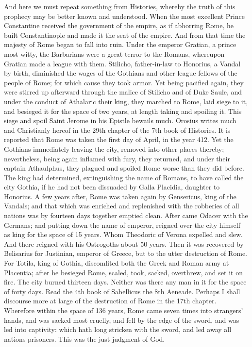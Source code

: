 And here we must repeat something from Histories, whereby the truth of this prophecy may be better known and understood. When the most excellent Prince Constantine received the government of the empire, as if abhorring Rome, he built Constantinople and made it the seat of the empire. And from that time the majesty of Rome began to fall into ruin. Under the emperor Gratian, a prince most witty, the Barbarians were a great terror to the Romans, whereupon Gratian made a league with them. Stilicho, father-in-law to Honorius, a Vandal by birth, diminished the wages of the Gothians and other league fellows of the people of Rome; for which cause they took armor. Yet being pacified again, they were stirred up afterward through the malice of Stilicho and of Duke Saule, and under the conduct of Athalaric their king, they marched to Rome, laid siege to it, and besieged it for the space of two years, at length taking and spoiling it. This siege and spoil Saint Jerome in his Epistle bewails much. Orosius writes much and Christianly hereof in the 29th chapter of the 7th book of Histories. It is reported that Rome was taken the first day of April, in the year 412. Yet the Gothians immediately leaving the city, removed into other places thereby; nevertheless, being again inflamed with fury, they returned, and under their captain Athaulphus, they plagued and spoiled Rome worse than they did before. The king had determined, extinguishing the name of Romans, to have called the city Gothia, if he had not been dissuaded by Galla Placidia, daughter to Honorius. A few years after, Rome was taken again by Gensericus, king of the Vandals; and that which was enriched and replenished with the robberies of all nations was by fourteen days together emptied clean. After came Odacer with the Germans; and putting down the name of emperor, reigned over the city himself as king for the space of 15 years. Whom Theodoric of Verona expelled and slew. And there reigned with his Ostrogoths about 50 years. Then it was recovered by Belisarius for Justinian, emperor of Greece, but to the utter destruction of Rome. For Totila, king of Gothia, discomfited both the Greek and Roman army at Placentia; after he besieged Rome, scaled, took, sacked, overthrew, and set it on fire. The city burned thirteen days. Neither was there any man in it for the space of forty days. Read the 4th book of Sabellicus the 8th Aeneade. Perhaps I shall discourse more at large of the destruction of Rome in the 17th chapter. Wherefore within the space of 136 years, Rome came seven times into strangers' hands, and was sacked most cruelly, and fell by the edge of the sword, and was led into captivity: which hath long stricken with the sword, and led away all nations prisoners. This was the just judgment of God.

